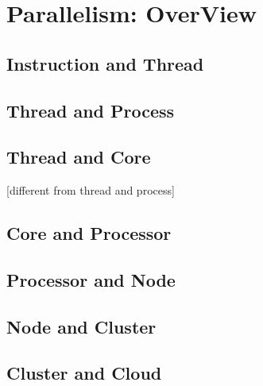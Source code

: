 \documentclass[main]{subfiles}
\begin{document}
\section{Parallelism: OverView}
\subsection{Instruction and Thread}
\subsection{Thread and Process}
\subsection{Thread and Core}
[different from thread and process]
\subsection{Core and Processor}
\subsection{Processor and Node}
\subsection{Node and Cluster}
\subsection{Cluster and Cloud}
\end{document}
